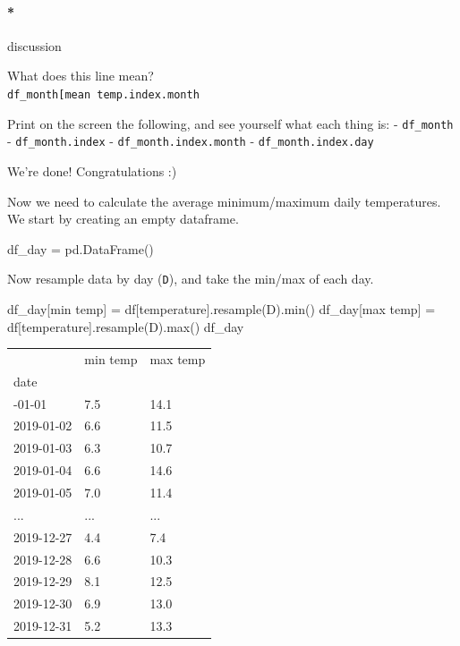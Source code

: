 \documentclass[
  letterpaper,
  DIV=11,
  numbers=noendperiod,
  oneside]{scrreprt}
\let\oldparagraph\paragraph
\renewcommand{\paragraph}[1]{\oldparagraph{#1}\mbox{}}
\newenvironment{Shaded}{\begin{snugshade}}{\end{snugshade}}
\newcommand{\BuiltInTok}[1]{\textcolor[rgb]{0.00,0.23,0.31}{#1}}
\newcommand{\NormalTok}[1]{\textcolor[rgb]{0.00,0.23,0.31}{#1}}
\newcommand{\OperatorTok}[1]{\textcolor[rgb]{0.37,0.37,0.37}{#1}}
\newcommand{\StringTok}[1]{\textcolor[rgb]{0.13,0.47,0.30}{#1}}
\begin{document}
\hypertarget{discussion-3}{%
\paragraph*{discussion}\label{discussion-3}}

What does this line mean?\\
\texttt{df\_month{[}\textquotesingle{}mean\ temp\textquotesingle{}{]}.index.month}

Print on the screen the following, and see yourself what each thing is:
- \texttt{df\_month} - \texttt{df\_month.index} -
\texttt{df\_month.index.month} - \texttt{df\_month.index.day}

We're done! Congratulations :)

Now we need to calculate the average minimum/maximum daily temperatures.
We start by creating an empty dataframe.

\begin{Shaded}
\begin{Highlighting}[]
\NormalTok{df\_day }\OperatorTok{=}\NormalTok{ pd.DataFrame()}
\end{Highlighting}
\end{Shaded}

Now resample data by day (\texttt{D}), and take the min/max of each day.

\begin{Shaded}
\begin{Highlighting}[]
\NormalTok{df\_day[}\StringTok{\textquotesingle{}min temp\textquotesingle{}}\NormalTok{] }\OperatorTok{=}\NormalTok{ df[}\StringTok{\textquotesingle{}temperature\textquotesingle{}}\NormalTok{].resample(}\StringTok{\textquotesingle{}D\textquotesingle{}}\NormalTok{).}\BuiltInTok{min}\NormalTok{()}
\NormalTok{df\_day[}\StringTok{\textquotesingle{}max temp\textquotesingle{}}\NormalTok{] }\OperatorTok{=}\NormalTok{ df[}\StringTok{\textquotesingle{}temperature\textquotesingle{}}\NormalTok{].resample(}\StringTok{\textquotesingle{}D\textquotesingle{}}\NormalTok{).}\BuiltInTok{max}\NormalTok{()}
\NormalTok{df\_day}
\end{Highlighting}
\end{Shaded}

\begin{longtable}[]{@{}lll@{}}
\toprule\noalign{}
& min temp & max temp \\
date & & \\
\midrule\noalign{}
\endhead
\bottomrule\noalign{}
\endlastfoot
2019-01-01 & 7.5 & 14.1 \\
2019-01-02 & 6.6 & 11.5 \\
2019-01-03 & 6.3 & 10.7 \\
2019-01-04 & 6.6 & 14.6 \\
2019-01-05 & 7.0 & 11.4 \\
... & ... & ... \\
2019-12-27 & 4.4 & 7.4 \\
2019-12-28 & 6.6 & 10.3 \\
2019-12-29 & 8.1 & 12.5 \\
2019-12-30 & 6.9 & 13.0 \\
2019-12-31 & 5.2 & 13.3 \\
\end{longtable}
\end{document}
